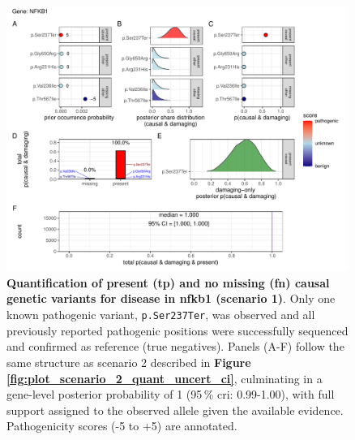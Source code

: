\begin{figure}[h]
  \centering
  \includegraphics[width=0.99\textwidth]{../images/plot_scenario_1_quant_uncert_ci.pdf}
  \caption{
 \textbf{Quantification of present (\ac{tp}) and no missing (\ac{fn}) causal genetic variants for disease in \ac{nfkb1} (scenario 1)}.
  Only one known pathogenic variant, \texttt{p.Ser237Ter}, was observed and all previously reported pathogenic positions were successfully sequenced and confirmed as reference (true negatives).  
  Panels (A-F) follow the same structure as scenario 2 described in \textbf{Figure \ref{fig:plot_scenario_2_quant_uncert_ci}}, culminating in a gene-level posterior probability of 1 (95\,\% \ac{cri}: 0.99-1.00), with full support assigned to the observed allele given the available evidence. Pathogenicity scores (-5 to +5) are annotated.
  }
  \label{fig:plot_scenario_1_quant_uncert_ci}
\end{figure}

